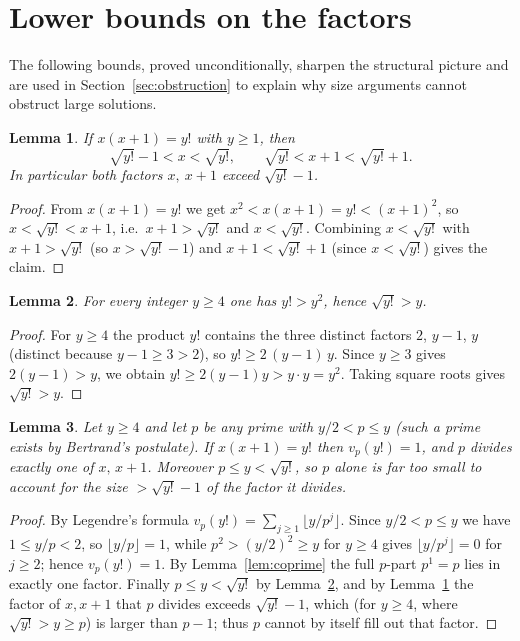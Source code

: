 \documentclass{amsart}
\theoremstyle{plain}
\newtheorem{lemma}{Lemma}
\theoremstyle{remark}
\begin{document}
\section{Lower bounds on the factors}\label{sec:bounds}

The following bounds, proved unconditionally, sharpen the structural picture
and are used in Section~\ref{sec:obstruction} to explain why size arguments
cannot obstruct large solutions.

\begin{lemma}\label{lem:size}
If $x(x+1)=y!$ with $y\ge1$, then
\[
   \sqrt{y!}-1<x<\sqrt{y!},\qquad \sqrt{y!}<x+1<\sqrt{y!}+1 .
\]
In particular both factors $x,\ x+1$ exceed $\sqrt{y!}-1$.
\end{lemma}

\begin{proof}
From $x(x+1)=y!$ we get $x^2<x(x+1)=y!<(x+1)^2$, so $x<\sqrt{y!}<x+1$, i.e.\
$x+1>\sqrt{y!}$ and $x<\sqrt{y!}$. Combining $x<\sqrt{y!}$ with
$x+1>\sqrt{y!}$ (so $x>\sqrt{y!}-1$) and $x+1<\sqrt{y!}+1$ (since
$x<\sqrt{y!}$) gives the claim.
\end{proof}

\begin{lemma}\label{lem:factbig}
For every integer $y\ge4$ one has $y!>y^2$, hence $\sqrt{y!}>y$.
\end{lemma}

\begin{proof}
For $y\ge4$ the product $y!$ contains the three distinct factors $2$, $y-1$,
$y$ (distinct because $y-1\ge3>2$), so $y!\ge 2\,(y-1)\,y$. Since $y\ge3$
gives $2(y-1)>y$, we obtain $y!\ge 2(y-1)y>y\cdot y=y^2$. Taking square
roots gives $\sqrt{y!}>y$.
\end{proof}

\begin{lemma}\label{lem:bigprime}
Let $y\ge4$ and let $p$ be any prime with $y/2<p\le y$ (such a prime exists
by Bertrand's postulate). If $x(x+1)=y!$ then $v_p(y!)=1$, and $p$ divides
exactly one of $x,\,x+1$. Moreover $p\le y<\sqrt{y!}$, so $p$ alone is far
too small to account for the size $>\sqrt{y!}-1$ of the factor it divides.
\end{lemma}

\begin{proof}
By Legendre's formula $v_p(y!)=\sum_{j\ge1}\lfloor y/p^j\rfloor$. Since
$y/2<p\le y$ we have $1\le y/p<2$, so $\lfloor y/p\rfloor=1$, while
$p^2>(y/2)^2\ge y$ for $y\ge4$ gives $\lfloor y/p^j\rfloor=0$ for $j\ge2$;
hence $v_p(y!)=1$. By Lemma~\ref{lem:coprime} the full $p$-part $p^1=p$ lies
in exactly one factor. Finally $p\le y<\sqrt{y!}$ by Lemma~\ref{lem:factbig},
and by Lemma~\ref{lem:size} the factor of $x,x+1$ that $p$ divides exceeds
$\sqrt{y!}-1$, which (for $y\ge4$, where $\sqrt{y!}>y\ge p$) is larger than
$p-1$; thus $p$ cannot by itself fill out that factor.
\end{proof}
\end{document}

